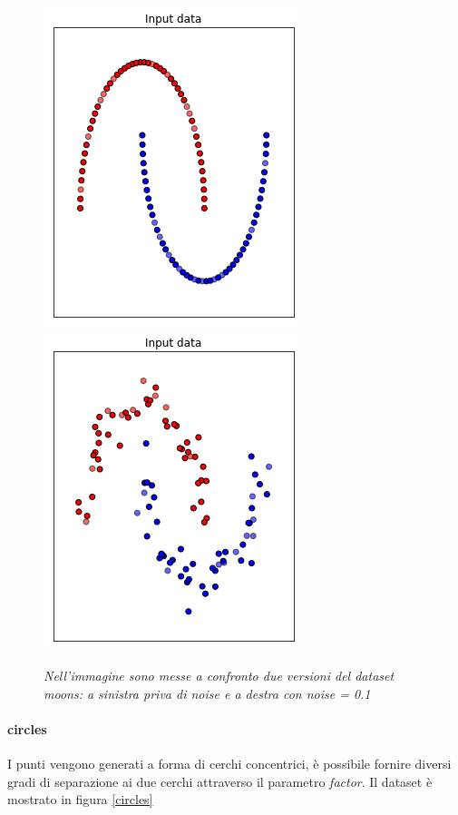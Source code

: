 \documentclass[12pt,a4paper]{report}
\begin{document}
\begin{figure}[H]
 \centering
 \includegraphics[scale = 0.5]{images/moons_nonoise}
 \includegraphics[scale = 0.5]{images/moons_noise}
 \caption{\textit{Nell'immagine sono messe a confronto due versioni del dataset moons: a sinistra priva di noise e a destra con noise = 0.1}}
 \label{moons}
\end{figure}

\paragraph{circles} I punti vengono generati a forma di cerchi concentrici, è possibile fornire diversi gradi di separazione ai due cerchi attraverso il parametro \textit{factor}. Il dataset è mostrato in figura \ref{circles}
\end{document}
